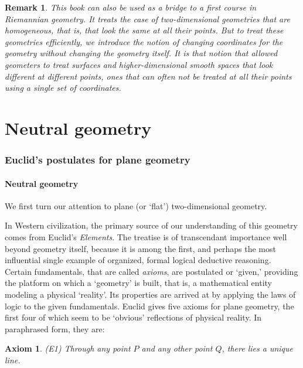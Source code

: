 \documentclass{article}%
\newtheorem{axiom}[theorem]{Axiom}
\newtheorem{remark}[theorem]{Remark}
\begin{document}
\begin{remark}
This book can also be used as a bridge to a first course in Riemannian
geometry. It treats the case of two-dimensional geometries that are
homogeneous, that is, that look the same at all their points. But to treat
these geometries efficiently, we introduce the notion of changing coordinates
for the geometry without changing the geometry itself. It is that notion that
allowed geometers to treat surfaces and higher-dimensional smooth spaces that
look different at different points, ones that can often not be treated at all
their points using a single set of coordinates.
\end{remark}

\pagebreak

\part{Neutral geometry\label{II}}

\section{Euclid's postulates for plane geometry}

\subsection{Neutral geometry}

We first turn our attention to plane (or `flat') two-dimensional geometry.

In Western civilization, the primary source of our understanding of this
geometry comes from Euclid's \textit{Elements}. The treatise is of
transcendant importance well beyond geometry itself, because it is among the
first, and perhaps the most influential single example of organized, formal
logical deductive reasoning. Certain fundamentals, that are called
\textit{axioms}, are postulated or `given,' providing the platform on which a
`geometry' is built, that is, a mathematical entity modeling a physical
`reality'. Its properties are arrived at by applying the laws of logic to the
given fundamentals. Euclid gives five axioms for plane geometry, the first
four of which seem to be `obvious' reflections of physical reality. In
paraphrased form, they are:

\begin{axiom}
(E1) Through any point $P$ and any other point $Q$, there lies a unique line.
\end{axiom}
\end{document}
